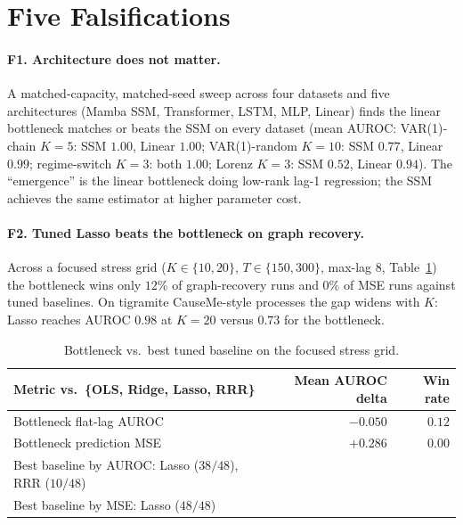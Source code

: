 \documentclass{article}
\begin{document}
\section{Five Falsifications}
\label{sec:falsifications}

\paragraph{F1. Architecture does not matter.} A matched-capacity,
matched-seed sweep across four datasets and five architectures
(Mamba SSM, Transformer, LSTM, MLP, Linear) finds the
linear bottleneck matches or beats the SSM on every dataset (mean
AUROC: VAR(1)-chain $K{=}5$: SSM $1.00$, Linear $1.00$;
VAR(1)-random $K{=}10$: SSM $0.77$, Linear $\mathbf{0.99}$;
regime-switch $K{=}3$: both $1.00$;
Lorenz $K{=}3$: SSM $0.52$, Linear $\mathbf{0.94}$). The
``emergence'' is the linear bottleneck doing low-rank lag-1 regression;
the SSM achieves the same estimator at higher parameter cost.

\paragraph{F2. Tuned Lasso beats the bottleneck on graph recovery.}
Across a focused stress grid ($K \in \{10, 20\}$, $T \in \{150, 300\}$,
max-lag 8, Table~\ref{tab:lasso}) the bottleneck wins only $12\%$ of
graph-recovery runs and $0\%$ of MSE runs against tuned baselines. On
tigramite CauseMe-style processes the gap widens with $K$: Lasso reaches
AUROC $0.98$ at $K{=}20$ versus $0.73$ for the bottleneck.

\begin{table}[t]
\centering
\small
\caption{Bottleneck vs.\ best tuned baseline on the focused stress grid.}
\label{tab:lasso}
\begin{tabular}{lrr}
\toprule
Metric vs.\ \{OLS, Ridge, Lasso, RRR\} & Mean AUROC delta & Win rate \\
\midrule
Bottleneck flat-lag AUROC      & $-0.050$ & $0.12$ \\
Bottleneck prediction MSE      & $+0.286$ & $0.00$ \\
Best baseline by AUROC: Lasso ($38/48$), RRR ($10/48$) & & \\
Best baseline by MSE:   Lasso ($48/48$)              & & \\
\bottomrule
\end{tabular}
\end{table}
\end{document}
